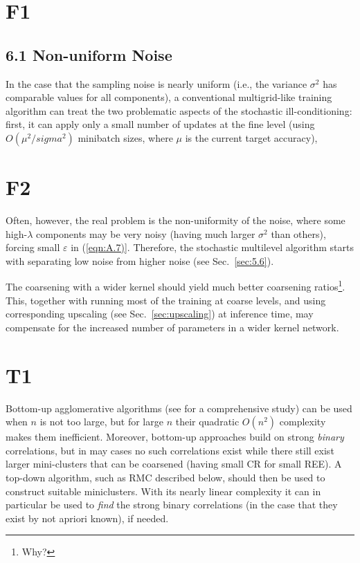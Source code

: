 \documentclass{article} %
\begin{document}
\section{F1}
\subsection{6.1 Non-uniform Noise}
In the case that the sampling noise is nearly uniform (i.e., the variance $\sigma^2$ has comparable values for all components), a conventional multigrid-like training algorithm can treat the two problematic aspects of the stochastic ill-conditioning: first, it can apply only a small number of updates at the fine level (using $O(\mu^2/sigma^2)$ minibatch sizes, where $\mu$ is the current target accuracy),

\section{F2}
Often, however, the real problem is the non-uniformity of the noise, where some high-$\lambda$ components may be very noisy (having much larger $\sigma^2$ than others), forcing small $\varepsilon$ in (\ref{eqn:A.7)}. Therefore, the stochastic multilevel algorithm starts with separating low noise from higher noise (see Sec.~\ref{sec:5.6}).

The coarsening with a wider kernel should yield much better coarsening ratios\footnote{Why?}. This, together with running most of the training at coarse levels, and using corresponding upscaling (see Sec.~\ref{sec:upscaling}) at inference time, may compensate for the increased number of parameters in a wider kernel network.

\section{T1}
Bottom-up agglomerative algorithms (see \cite{17} for a comprehensive study) can be used when $n$ is not too large, but for large $n$ their quadratic $O(n^2)$ complexity makes them inefficient. Moreover, bottom-up approaches build on strong {\it binary} correlations, but in may cases no such correlations exist while there still exist larger mini-clusters that can be coarsened (having small CR for small REE). A top-down algorithm, such as RMC described below, should then be used to construct suitable miniclusters. With its nearly linear complexity it can in particular be used to {\it find} the strong binary correlations (in the case that they exist by not apriori known), if needed.
\end{document}
